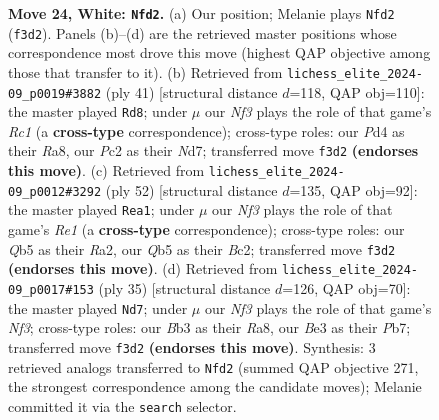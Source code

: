 \documentclass[11pt]{article}
\begin{document}
\begin{figure}[p]
\caption{\textbf{Move 24, White: \texttt{Nfd2}.} (a) Our position; Melanie plays \texttt{Nfd2} (\texttt{f3d2}). Panels (b)--(d) are the retrieved master positions whose correspondence most drove this move (highest QAP objective among those that transfer to it). (b) Retrieved from \texttt{lichess\_elite\_2024-09\_p0019\#3882} (ply 41) [structural distance $d$=118, QAP obj=110]: the master played \texttt{Rd8}; under $\mu$ our \emph{Nf3} plays the role of that game's \emph{Rc1} (a \textbf{cross-type} correspondence); cross-type roles: our \emph{P}d4 as their \emph{R}a8, our \emph{P}c2 as their \emph{N}d7; transferred move \texttt{f3d2} \textbf{(endorses this move)}. (c) Retrieved from \texttt{lichess\_elite\_2024-09\_p0012\#3292} (ply 52) [structural distance $d$=135, QAP obj=92]: the master played \texttt{Rea1}; under $\mu$ our \emph{Nf3} plays the role of that game's \emph{Re1} (a \textbf{cross-type} correspondence); cross-type roles: our \emph{Q}b5 as their \emph{R}a2, our \emph{Q}b5 as their \emph{B}c2; transferred move \texttt{f3d2} \textbf{(endorses this move)}. (d) Retrieved from \texttt{lichess\_elite\_2024-09\_p0017\#153} (ply 35) [structural distance $d$=126, QAP obj=70]: the master played \texttt{Nd7}; under $\mu$ our \emph{Nf3} plays the role of that game's \emph{Nf3}; cross-type roles: our \emph{B}b3 as their \emph{R}a8, our \emph{B}e3 as their \emph{P}b7; transferred move \texttt{f3d2} \textbf{(endorses this move)}. Synthesis: 3 retrieved analogs transferred to \texttt{Nfd2} (summed QAP objective 271, the strongest correspondence among the candidate moves); Melanie committed it via the \texttt{search} selector.}
\label{fig:thought-m46}
\end{figure}

\clearpage
\end{document}
